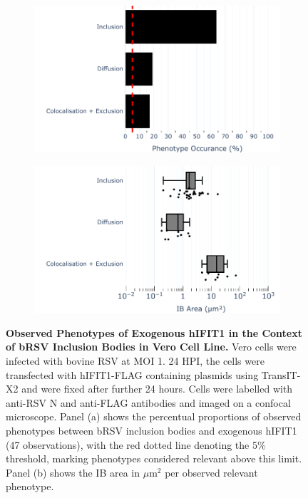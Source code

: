 \begin{figure}
    \begin{subfigure}{0.495\textwidth}
        \caption{}
        \includegraphics[width=1\linewidth]{09. Chapter 4/Figs/02. Overexpression/01. IFIT1/04. bar_i1_brsv.pdf} 
    \end{subfigure}
    \begin{subfigure}{0.495\textwidth}
        \caption{}
        \includegraphics[width=1\linewidth]{09. Chapter 4/Figs/02. Overexpression/01. IFIT1/05. box_i1_brsv.pdf}
    \end{subfigure}
    \caption[Observed Phenotypes of Exogenous hIFIT1 in the Context of bRSV Inclusion Bodies in Vero Cell Line.]{\textbf{Observed Phenotypes of Exogenous hIFIT1 in the Context of bRSV Inclusion Bodies in Vero Cell Line.} Vero cells were infected with bovine RSV at MOI 1. 24 HPI, the cells were transfected with hIFIT1-FLAG containing plasmids using TransIT-X2 and were fixed after further 24 hours. Cells were labelled with anti-RSV N and anti-FLAG antibodies and imaged on a confocal microscope. Panel (a) shows the percentual proportions of observed phenotypes between bRSV inclusion bodies and exogenous hIFIT1 (47 observations), with the red dotted line denoting the 5\% threshold, marking phenotypes considered relevant above this limit. Panel (b) shows the IB area in \(\mu \mbox{m}^2\) per observed relevant phenotype.}
    \label{fig:Observed Phenotypes of Exogenous hIFIT1 in the Context of bRSV Inclusion Bodies in VERO Cell Line}
\end{figure}


